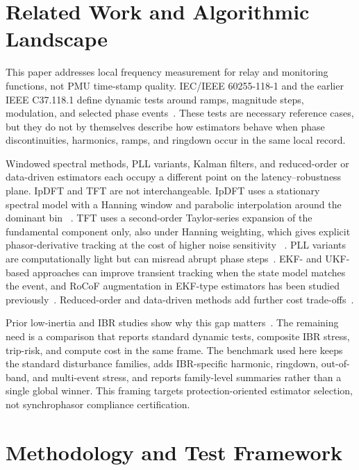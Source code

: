 \documentclass[conference,letterpaper]{IEEEtran}
\begin{document}
\section{Related Work and Algorithmic Landscape}
\label{sec:related}

This paper addresses local frequency measurement for relay and monitoring
functions, not PMU time-stamp quality. IEC/IEEE 60255-118-1 and the earlier
IEEE C37.118.1 define dynamic tests around ramps, magnitude steps, modulation,
and selected phase events~\cite{IEEE_C37_118,IEC_IEEE_60255_118_1_2018}. These
tests are necessary reference cases, but they do not by themselves describe
how estimators behave when phase discontinuities, harmonics, ramps, and
ringdown occur in the same local record.

Windowed spectral methods, PLL variants, Kalman filters, and reduced-order or
data-driven estimators each occupy a different point on the latency--robustness
plane. IpDFT and TFT are not interchangeable. IpDFT uses a stationary spectral
model with a Hanning window and parabolic interpolation around the dominant bin
~\cite{Belega2014}. TFT uses a second-order Taylor-series expansion of the
fundamental component only, also under Hanning weighting, which gives explicit
phasor-derivative tracking at the cost of higher noise sensitivity
~\cite{PlatasGarza2011}.
PLL variants are computationally light but can misread abrupt phase
steps~\cite{Golestan2017,Wright2019}. EKF- and UKF-based approaches can improve
transient tracking when the state model matches the event, and RoCoF
augmentation in EKF-type estimators has been studied previously~\cite{Ferrero2020EKF,Chamorro2021}.
Reduced-order and data-driven methods add further cost trade-offs~\cite{Netto2018KoopmanKF,Ting2022}.

Prior low-inertia and IBR studies show why this gap matters~\cite{Milano2018LowInertia,Pinheiro2025,Ponce2025,Bernal2025,Zoghby2024}.
The remaining need is a comparison that reports standard dynamic tests,
composite IBR stress, trip-risk, and compute cost in the same frame. The
benchmark used here keeps the standard disturbance families, adds IBR-specific
harmonic, ringdown, out-of-band, and multi-event stress, and reports
family-level summaries rather than a single global winner. This framing
targets protection-oriented estimator selection, not synchrophasor compliance
certification.

\section{Methodology and Test Framework}
\label{sec:methodology}
\end{document}
